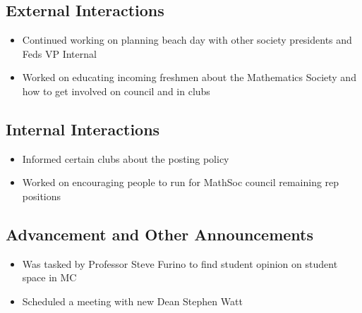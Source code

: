 \subsection*{External Interactions}
\begin{itemize}
	\item Continued working on planning beach day with other society presidents and Feds VP Internal
	\item Worked on educating incoming freshmen about the Mathematics Society and how to get involved on council and in clubs
\end{itemize}

\subsection*{Internal Interactions}
\begin{itemize}
	\item Informed certain clubs about the posting policy 
	\item Worked on encouraging people to run for MathSoc council remaining rep positions
\end{itemize}


\subsection*{Advancement and Other Announcements}
\begin{itemize}
	\item Was tasked by Professor Steve Furino to find student opinion on student space in MC
	\item Scheduled a meeting with new Dean Stephen Watt
\end{itemize}